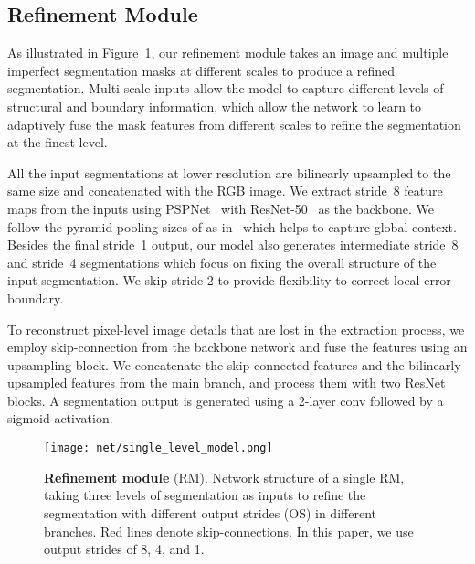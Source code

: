 \documentclass[10pt,twocolumn,letterpaper]{article}
\begin{document}
\vspace{-0.05in}
\subsection{Refinement Module}
\vspace{-0.05in}
As illustrated in Figure~\ref{fig:single_level}, our refinement module takes an image and multiple imperfect segmentation masks at different scales to produce a refined segmentation. 
Multi-scale inputs allow the model to capture different levels of structural and boundary information, which allow the network to learn to adaptively fuse the mask features from different scales to refine the segmentation at the finest level. 

All the input segmentations at lower resolution are bilinearly upsampled to the same size and concatenated with the RGB image. We extract stride~8 feature maps from the inputs using PSPNet~\cite{zhao2017pyramid} with ResNet-50~\cite{he2016deep} as the backbone. We follow the pyramid pooling sizes of  as in~\cite{zhao2017pyramid} which helps to capture global context. Besides the final stride~1 output, our model also generates intermediate stride~8 and stride~4 segmentations which focus on fixing the overall structure of the input segmentation. We skip stride 2 to provide flexibility to correct local error boundary.
 
To reconstruct pixel-level image details that are lost in the extraction process, we employ skip-connection from the backbone network and fuse the features using an upsampling block. We concatenate the skip connected features and the bilinearly upsampled features from the main branch, and process them with two ResNet blocks. A segmentation output is generated using a 2-layer  conv followed by a sigmoid activation. 

\begin{figure}[t]
	\begin{center}
		\texttt{[image: net/single\_level\_model.png]}
	\end{center}
	\vspace{-0.15in}
	\caption{\textbf{Refinement module} (RM). Network structure of a single RM, taking three levels of segmentation as inputs to refine the segmentation with different output strides (OS) in different branches. Red lines denote skip-connections. In this paper, we use output strides of 8, 4, and 1.}
	\label{fig:single_level}
	\vspace{-0.15in}
\end{figure}
\end{document}
